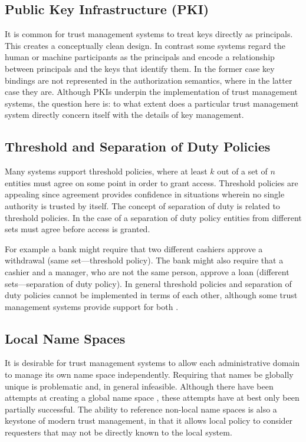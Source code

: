 \subsection{Public Key Infrastructure (PKI)}

It is common for trust management systems to treat keys directly as principals. This creates a
conceptually clean design. In contrast some systems regard the human or machine participants as
the principals and encode a relationship between principals and the keys that identify them. In
the former case key bindings are not represented in the authorization semantics, where in the
latter case they are. Although PKIs underpin the implementation of trust management systems, the
question here is: to what extent does a particular trust management system directly concern
itself with the details of key management.

\subsection{Threshold and Separation of Duty Policies}

Many systems support threshold policies, where at least $k$ out of a set of $n$ entities must
agree on some point in order to grant access. Threshold policies are appealing since agreement
provides confidence in situations wherein no single authority is trusted by itself. The concept
of separation of duty is related to threshold policies. In the case of a separation of duty
policy entities from different sets must agree before access is granted.

For example a bank might require that two different cashiers approve a withdrawal (same
set---threshold policy). The bank might also require that a cashier and a manager, who are not
the same person, approve a loan (different sets---separation of duty policy). In general
threshold policies and separation of duty policies cannot be implemented in terms of each other,
although some trust management systems provide support for both \cite{Li:DRBTMF}.

\subsection{Local Name Spaces}

It is desirable for trust management systems to allow each administrative domain to manage its
own name space independently. Requiring that names be globally unique is problematic and, in
general infeasible. Although there have been attempts at creating a global name space
\cite{X500}, these attempts have at best only been partially successful. The ability to
reference non-local name spaces is also a keystone of modern trust management, in that it allows
local policy to consider requesters that may not be directly known to the local system.

